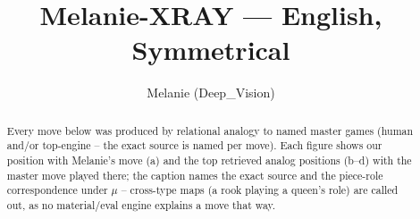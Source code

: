 \documentclass[11pt]{article}
\title{Melanie-XRAY — English, Symmetrical}
\author{Melanie (Deep\_Vision)}
\date{}
\begin{document}
\maketitle

\begin{abstract}Every move below was produced by relational analogy to named master games (human and/or top-engine -- the exact source is named per move). Each figure shows our position with Melanie's move (a) and the top retrieved analog positions (b--d) with the master move played there; the caption names the exact source and the piece-role correspondence under $\mu$ -- cross-type maps (a rook playing a queen's role) are called out, as no material/eval engine explains a move that way.\end{abstract}

\begin{figure}[p]\centering
\begin{subfigure}{0.46\textwidth}\centering
\resizebox{\linewidth}{!}{%
\newchessgame
\chessboard[
  setfen={r1bq1rk1/pp1pppbp/2n2np1/2p5/2P4P/2N2NP1/PP1PPPB1/R1BQ1RK1 b - - 0 7},
  showmover=false,
  pgfstyle=straightmove, color=movearrow, markmove={a8-b8}
]}
\caption{}
\end{subfigure}\hfill
\begin{subfigure}{0.46\textwidth}\centering
\resizebox{\linewidth}{!}{%
\newchessgame
\chessboard[
  setfen={r1bq1rk1/1pppppbp/p1n2np1/8/2PP4/2N2NP1/PP2PPBP/R1BQ1RK1 b - - 0 7},
  showmover=false,
  pgfstyle=straightmove, color=movearrow, markmove={a8-b8}
]}
\caption{}
\end{subfigure}
\\[4pt]
\begin{subfigure}{0.46\textwidth}\centering
\resizebox{\linewidth}{!}{%
\newchessgame
\chessboard[
  setfen={r1bq1rk1/1pppppbp/p1n2np1/8/2PP4/2N2NP1/PP2PPBP/R1BQ1RK1 b - - 0 7},
  showmover=false,
  pgfstyle=straightmove, color=movearrow, markmove={a8-b8}
]}
\caption{}
\end{subfigure}\hfill
\begin{subfigure}{0.46\textwidth}\centering
\resizebox{\linewidth}{!}{%
\newchessgame
\chessboard[
  setfen={r1bq1rk1/1pppppbp/p1n2np1/8/2PP4/2N2NP1/PP2PPBP/R1BQ1RK1 b - - 0 7},
  showmover=false,
  pgfstyle=straightmove, color=movearrow, markmove={a8-b8}
]}
\caption{}
\end{subfigure}

\end{figure}
\end{document}
